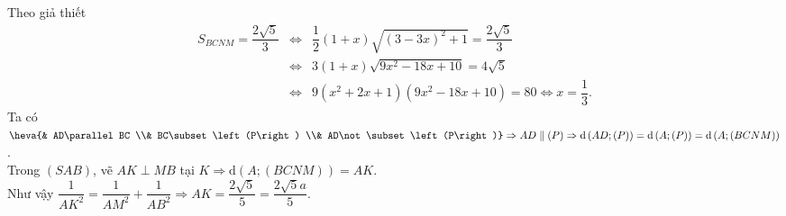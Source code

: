 \begin{ex}
{		Theo giả thiết
		\allowdisplaybreaks
		\begin{eqnarray*}
			S_{BCNM}=\dfrac{2\sqrt{5}}{3}&\Leftrightarrow& \dfrac{1}{2}\left(1+x\right)\sqrt{\left(3-3x\right)^{2}+1}=\dfrac{2\sqrt{5}}{3}\\
			&\Leftrightarrow& 3\left(1+x\right)\sqrt{9x^2-18x+10}=4\sqrt{5}\\
			&\Leftrightarrow& 9\left(x^2+2x+1\right)\left(9x^2-18x+10\right)=80\Leftrightarrow x=\dfrac{1}{3}.
		\end{eqnarray*}
		Ta có $\heva{& AD\parallel BC \\& BC\subset \left(P\right) \\& AD\not\subset \left(P\right)}\Rightarrow AD\parallel \left(P\right)\Rightarrow \mathrm{d}\left(AD;\left(P\right)\right)=\mathrm{d}\left(A;\left(P\right)\right)=\mathrm{d}\left(A;\left(BCNM\right)\right)$.\\
		Trong $\left(SAB\right)$, vẽ $AK\perp MB$ tại $K\Rightarrow \mathrm{d}\left(A;\left(BCNM\right)\right)=AK$.\\
		Như vậy $\dfrac{1}{AK^2}=\dfrac{1}{AM^2}+\dfrac{1}{AB^2}\Rightarrow AK=\dfrac{2\sqrt{5}}{5}=\dfrac{2\sqrt{5}a}{5}$.
	}
\end{ex}
